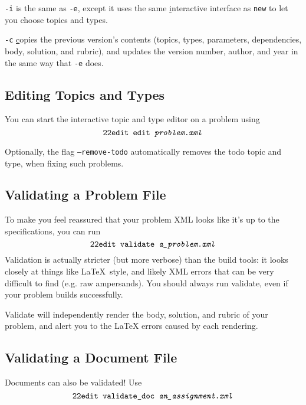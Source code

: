     \texttt{-i} is the same as \texttt{-e}, except it uses the same 
    \underline{i}nteractive interface as \pytool\texttt{new} to let you 
    choose topics and types.
    
    \texttt{-c} \underline{c}opies the previous version's contents 
    (topics, types, parameters, dependencies, body, solution, and rubric),
    and updates the version number, author, and year in the same way that 
    \texttt{-e} does.
    
  \subsection{Editing Topics and Types}
    You can start the interactive topic and type editor on a problem using 
    \[\texttt{22edit }\texttt{edit \textit{problem.xml}}\]
    
    Optionally, the flag \texttt{--remove-todo} automatically removes the 
    todo topic and type, when fixing such problems.
    
  \subsection{Validating a Problem File}
    To make you feel reassured that your problem XML looks like it's up to 
    the specifications, you can run 
    \[\texttt{22edit }\texttt{validate \textit{a\_problem.xml}}\] 
    Validation is actually stricter (but more verbose) than the build 
    tools: it looks closely at things like \LaTeX\ style, and likely XML 
    errors that can be very difficult to find (e.g. raw ampersands). 
    You should always run validate, even if your problem builds successfully.
    
    Validate will independently render the body, solution, and rubric of your
    problem, and alert you to the LaTeX errors caused by each rendering.
    
  \subsection{Validating a Document File}
    Documents can also be validated! Use
    \[\texttt{22edit }\texttt{validate\_doc \textit{an\_assignment.xml}}\]
